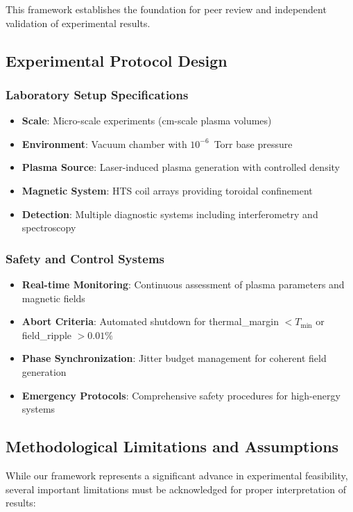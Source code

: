 \documentclass[12pt,a4paper]{article}
\begin{document}
This framework establishes the foundation for peer review and independent validation of experimental results.

\subsection{Experimental Protocol Design}

\subsubsection{Laboratory Setup Specifications}
\begin{itemize}
\item \textbf{Scale}: Micro-scale experiments (cm-scale plasma volumes)
\item \textbf{Environment}: Vacuum chamber with $10^{-6}$~Torr base pressure
\item \textbf{Plasma Source}: Laser-induced plasma generation with controlled density
\item \textbf{Magnetic System}: HTS coil arrays providing toroidal confinement
\item \textbf{Detection}: Multiple diagnostic systems including interferometry and spectroscopy
\end{itemize}

\subsubsection{Safety and Control Systems}
\begin{itemize}
\item \textbf{Real-time Monitoring}: Continuous assessment of plasma parameters and magnetic fields
\item \textbf{Abort Criteria}: Automated shutdown for thermal\_margin $< T_{\min}$ or field\_ripple $> 0.01\%$
\item \textbf{Phase Synchronization}: Jitter budget management for coherent field generation
\item \textbf{Emergency Protocols}: Comprehensive safety procedures for high-energy systems
\end{itemize}

\subsection{Methodological Limitations and Assumptions}

While our framework represents a significant advance in experimental feasibility, several important limitations must be acknowledged for proper interpretation of results:
\end{document}
